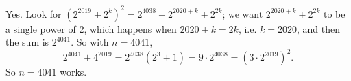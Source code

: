 Yes. Look for $(2^{2019}+2^k)^2=2^{4038}+2^{2020+k}+2^{2k}$; we want $2^{2020+k}+2^{2k}$ to be a single power of $2$, which happens when $2020+k=2k$, i.e. $k=2020$, and then the sum is $2^{4041}$. So with $n=4041$,
\[
2^{4041}+4^{2019}=2^{4038}(2^3+1)=9\cdot2^{4038}=\left(3\cdot2^{2019}\right)^2 .
\]
So $\boxed{n=4041}$ works.
